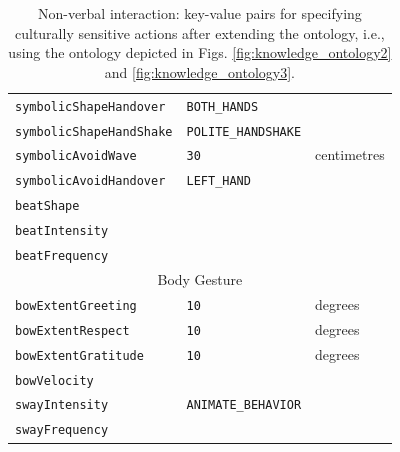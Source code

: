 \documentclass{CSSRforAfrica}
\begin{document}
\begin{table}[H]
\begin{center}
\begin{tabular}{|l l l|}
{\footnotesize \verb+symbolicShapeHandover+} 	        & {\footnotesize \verb+BOTH_HANDS+} & {\footnotesize  }\vspace{-1.01mm}\\
{\footnotesize \verb+symbolicShapeHandShake+} 	                 & {\footnotesize \verb+POLITE_HANDSHAKE+} & {\footnotesize  }\vspace{-1.01mm}\\
{\footnotesize \verb+symbolicAvoidWave+} 	                 & {\footnotesize \verb+30+  } & {\footnotesize centimetres }\vspace{-1.01mm}\\
{\footnotesize \verb+symbolicAvoidHandover+} 	   & {\footnotesize \verb+LEFT_HAND+ }& {\footnotesize }\vspace{-1.01mm}\\
{\footnotesize \verb+beatShape+} 	                         & {\footnotesize \verb++} & {\footnotesize  }\vspace{-1.01mm}\\
{\footnotesize \verb+beatIntensity+} 	                 & {\footnotesize \verb++} & {\footnotesize  }\vspace{-1.01mm}\\
{\footnotesize \verb+beatFrequency+} 	                 & {\footnotesize \verb++} & {\footnotesize  }\vspace{-1.01mm}\\ 
\hline
\multicolumn{3}{|c|}{{\footnotesize Body Gesture}} \vspace{-0mm}\\
\hline
{\footnotesize \verb+bowExtentGreeting+} 	                        & {\footnotesize \verb+10+} & {\footnotesize  degrees}\vspace{-1.01mm}\\
{\footnotesize \verb+bowExtentRespect+} 	                        & {\footnotesize \verb+10+} & {\footnotesize  degrees}\vspace{-1.01mm}\\
{\footnotesize \verb+bowExtentGratitude+} 	                        & {\footnotesize \verb+10+} & {\footnotesize  degrees}\vspace{-1.01mm}\\
{\footnotesize \verb+bowVelocity+}                       & {\footnotesize \verb++} & {\footnotesize  }\vspace{-1.01mm}\\
{\footnotesize \verb+swayIntensity+} 	                & {\footnotesize \verb+ANIMATE_BEHAVIOR+} & {\footnotesize  }\vspace{-1.01mm}\\
{\footnotesize \verb+swayFrequency+} 	                & {\footnotesize \verb++} & {\footnotesize  }\\
\hline \hline
\end{tabular}
\end{center}
\vspace{-6mm}
\caption{Non-verbal interaction: key-value pairs for specifying culturally sensitive actions after extending the ontology, i.e., using the ontology depicted in Figs. \ref{fig:knowledge_ontology2} and \ref{fig:knowledge_ontology3}.}
\label{table:key-value_pairs3}
\end{table}
\end{document}
